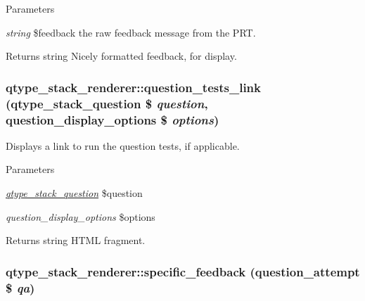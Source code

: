 \begin{DoxyParams}{Parameters}
\item[{\em string}]\$feedback the raw feedback message from the PRT. \end{DoxyParams}
\begin{DoxyReturn}{Returns}
string Nicely formatted feedback, for display. 
\end{DoxyReturn}
\hypertarget{classqtype__stack__renderer_a44386769fb98173ad4052eafd424fe07}{
\subsubsection[{question\_\-tests\_\-link}]{\setlength{\rightskip}{0pt plus 5cm}qtype\_\-stack\_\-renderer::question\_\-tests\_\-link ({\bf qtype\_\-stack\_\-question} \$ {\em question}, \/  question\_\-display\_\-options \$ {\em options})}}
\label{classqtype__stack__renderer_a44386769fb98173ad4052eafd424fe07}
Displays a link to run the question tests, if applicable. 
\begin{DoxyParams}{Parameters}
\item[{\em \hyperlink{classqtype__stack__question}{qtype\_\-stack\_\-question}}]\$question \item[{\em question\_\-display\_\-options}]\$options \end{DoxyParams}
\begin{DoxyReturn}{Returns}
string HTML fragment. 
\end{DoxyReturn}
\hypertarget{classqtype__stack__renderer_a4125328bed788238256940894f9053c3}{
\subsubsection[{specific\_\-feedback}]{\setlength{\rightskip}{0pt plus 5cm}qtype\_\-stack\_\-renderer::specific\_\-feedback (question\_\-attempt \$ {\em qa})}}
\label{classqtype__stack__renderer_a4125328bed788238256940894f9053c3}
